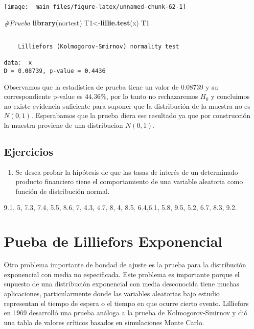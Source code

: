 \documentclass[
  a4paper,
  oneside,
  openany]{book}
\newenvironment{Shaded}{\begin{snugshade}}{\end{snugshade}}
\newcommand{\CommentTok}[1]{\textcolor[rgb]{0.56,0.35,0.01}{\textit{#1}}}
\newcommand{\FunctionTok}[1]{\textcolor[rgb]{0.13,0.29,0.53}{\textbf{#1}}}
\newcommand{\NormalTok}[1]{#1}
\newcommand{\OtherTok}[1]{\textcolor[rgb]{0.56,0.35,0.01}{#1}}
\providecommand{\tightlist}{%
  \setlength{\itemsep}{0pt}\setlength{\parskip}{0pt}}
\begin{document}
\begin{center}\texttt{[image: \_main\_files/figure-latex/unnamed-chunk-62-1]} \end{center}

\begin{Shaded}
\begin{Highlighting}[]
\CommentTok{\#Prueba}
\FunctionTok{library}\NormalTok{(nortest) }
\NormalTok{T1}\OtherTok{\textless{}{-}}\FunctionTok{lillie.test}\NormalTok{(x)}
\NormalTok{T1}
\end{Highlighting}
\end{Shaded}

\begin{verbatim}

    Lilliefors (Kolmogorov-Smirnov) normality test

data:  x
D = 0.08739, p-value = 0.4436
\end{verbatim}

Observamos que la estadística de prueba tiene un valor de 0.08739 y su correspondiente p-value es \(44.36\%\), por lo tanto no rechazaremos \(H_0\) y concluimos no existe evidencia suficiente para suponer que la distribución de la muestra no es \(N(0,1)\). Esperabamos que la prueba diera ese resultado ya que por construcción la muestra proviene de una distribucion \(N(0,1)\).

\hypertarget{ejercicios-14}{%
\section{Ejercicios}\label{ejercicios-14}}

\begin{enumerate}
\def\labelenumi{\arabic{enumi}.}
\tightlist
\item
  Se desea probar la hipótesis de que las tasas de interés de un determinado producto financiero tiene el comportamiento de una variable aleatoria como función de distribución normal.
\end{enumerate}

9.1, 5, 7.3, 7.4, 5.5, 8.6, 7, 4.3, 4.7, 8,
4, 8.5, 6.4,6.1, 5.8, 9.5, 5.2, 6.7, 8.3, 9.2.

\hypertarget{pueba-de-lilliefors-exponencial}{%
\chapter{Pueba de Lilliefors Exponencial}\label{pueba-de-lilliefors-exponencial}}

Otro problema importante de bondad de ajuste es la prueba para la distribución exponencial con media no especificada. Este problema es importante porque el supuesto de una distribución exponencial con media desconocida tiene muchas aplicaciones, particularmente donde las variables aleatorias bajo estudio representan el tiempo de espera o el tiempo en que ocurre cierto evento.
Lilliefors en 1969 desarrolló una prueba análoga a la prueba de Kolmogorov-Smirnov y dió una tabla de valores críticos basados en simulaciones Monte Carlo.
\end{document}
